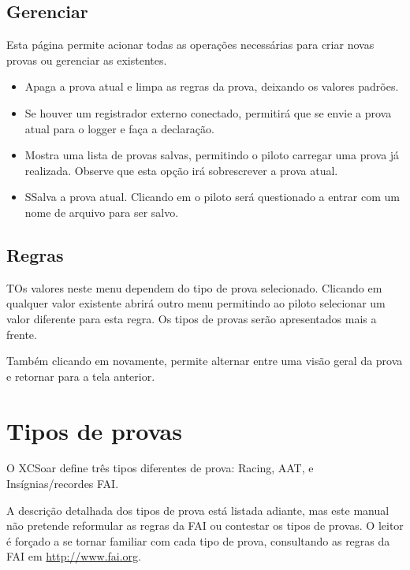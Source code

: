 \subsection*{Gerenciar}
Esta página permite acionar todas as operações necessárias para criar novas provas ou gerenciar
as existentes.


\begin{itemize}
\item [\bmenuw{Nova Prova}] Apaga a prova atual e limpa as regras da prova, deixando os valores padrões.
\item [\bmenuw{Declarar}] Se houver um registrador externo conectado, permitirá que se envie a prova atual para o logger e faça a declaração.
\item [\bmenuw{Procurar}] Mostra uma lista de provas salvas, permitindo o piloto carregar uma prova já realizada.  Observe que esta opção irá sobrescrever a prova atual.
\item [\bmenuw{Salvar}] SSalva a prova atual.  Clicando em 
   o piloto será questionado a entrar com um nome de arquivo para ser salvo.
\end{itemize}

\subsection*{Regras}
TOs valores neste menu dependem do tipo de prova selecionado.  Clicando 
 em qualquer valor existente abrirá outro menu permitindo ao piloto selecionar um valor diferente para esta regra.  Os tipos de provas serão apresentados mais a frente.

Também clicando em  novamente, permite alternar entre uma visão geral da prova e retornar para a tela anterior.  

\section{Tipos de provas}
O XCSoar define três tipos diferentes de prova: Racing, AAT, e Insígnias/recordes FAI.

A descrição detalhada dos tipos de prova está listada adiante, mas este manual não pretende reformular as regras da FAI ou contestar os tipos de provas.  O leitor é forçado a se tornar familiar com cada tipo de prova, consultando as regras da FAI em \url{http://www.fai.org}. 


